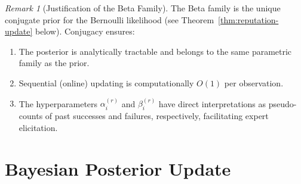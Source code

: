 \documentclass[12pt,openany]{book}
\numberwithin{equation}{chapter}
\theoremstyle{plain}
\theoremstyle{definition}
\theoremstyle{remark}
\newtheorem{remark}[theorem]{Remark}
\numberwithin{equation}{chapter}
\theoremstyle{plain}
\begin{document}
\begin{remark}[Justification of the Beta Family]
\label{rem:beta-justification}
The Beta family is the unique conjugate prior for the
Bernoulli likelihood (see Theorem~\ref{thm:reputation-update}
below).  Conjugacy ensures:
\begin{enumerate}
  \item[\textup{(i)}] The posterior is analytically tractable
        and belongs to the same parametric family as the prior.
  \item[\textup{(ii)}] Sequential (online) updating is
        computationally $O(1)$ per observation.
  \item[\textup{(iii)}] The hyperparameters $\alpha_i^{(r)}$
        and $\beta_i^{(r)}$ have direct interpretations as
        pseudo-counts of past successes and failures,
        respectively, facilitating expert elicitation.
\end{enumerate}
\end{remark}

\section{Bayesian Posterior Update}
\end{document}
